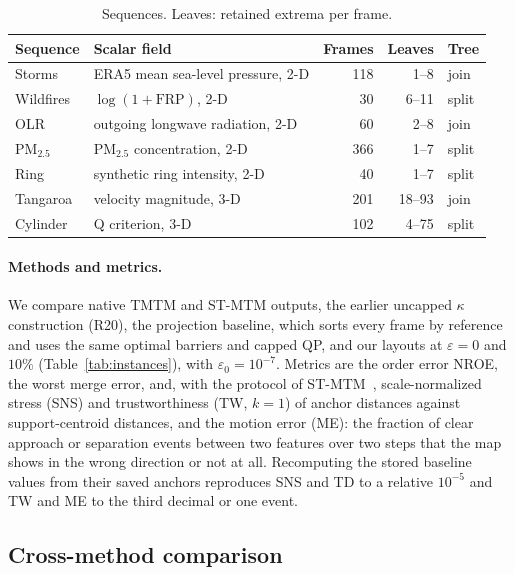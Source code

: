 \documentclass[review]{vgtc}                 %
\begin{document}
\begin{table}[t]
\caption{Sequences. Leaves: retained extrema per frame.}\label{tab:data}
\centering\scriptsize\setlength{\tabcolsep}{3pt}
\begin{tabular}{llrrl}\toprule
Sequence & Scalar field & Frames & Leaves & Tree\\\midrule
Storms & ERA5 mean sea-level pressure, 2-D & 118 & 1--8 & join\\
Wildfires & $\log(1+\mathrm{FRP})$, 2-D & 30 & 6--11 & split\\
OLR & outgoing longwave radiation, 2-D & 60 & 2--8 & join\\
PM$_{2.5}$ & PM$_{2.5}$ concentration, 2-D & 366 & 1--7 & split\\
Ring & synthetic ring intensity, 2-D & 40 & 1--7 & split\\
Tangaroa & velocity magnitude, 3-D & 201 & 18--93 & join\\
Cylinder & Q criterion, 3-D & 102 & 4--75 & split\\\bottomrule
\end{tabular}
\end{table}

\paragraph{Methods and metrics.} We compare native TMTM and ST-MTM outputs, the earlier uncapped $\kappa$ construction (R20), the projection baseline, which sorts every frame by reference and uses the same optimal barriers and capped QP, and our layouts at $\varepsilon=0$ and $10\%$ (Table~\ref{tab:instances}), with $\varepsilon_0=10^{-7}$. Metrics are the order error NROE, the worst merge error, and, with the protocol of ST-MTM~\cite{STMTM:2026}, scale-normalized stress (SNS) and trustworthiness (TW, $k=1$) of anchor distances against support-centroid distances, and the motion error (ME): the fraction of clear approach or separation events between two features over two steps that the map shows in the wrong direction or not at all. Recomputing the stored baseline values from their saved anchors reproduces SNS and TD to a relative $10^{-5}$ and TW and ME to the third decimal or one event.

\subsection{Cross-method comparison}\label{sec:compare}
\end{document}
